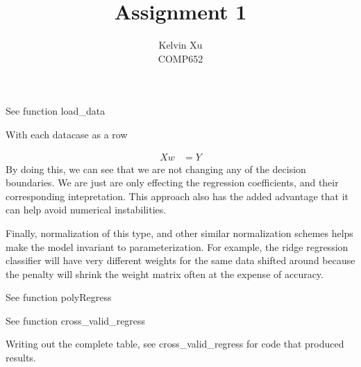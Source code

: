 \documentclass[12pt]{article}
\newenvironment{problem}[2][Problem]{\begin{trivlist}
\item[\hskip \labelsep {\bfseries #1}\hskip \labelsep {\bfseries #2.}]}{\end{trivlist}}
\begin{document}

\title{Assignment 1}%
\author{Kelvin Xu\\ %
COMP652} %

\maketitle
\begin{problem}{1. (a)}
See function load\_data
\end{problem}

\begin{problem}{1. (b)}
With each datacase as a row
\end{problem}
\begin{align*}
    Xw &= Y 
\end{align*}
By doing this, we can see that we are not changing any of the decision
boundaries. We are just are only effecting the regression coefficients, and
their corresponding intepretation. This approach also has the added advantage
that it can help avoid numerical instabilities.

Finally, normalization of this type, and other similar normalization schemes
helps make the model invariant to parameterization. For example, the ridge
regression classifier will have very different weights for the same data
shifted around because the penalty will shrink the weight matrix
often at the expense of accuracy. 

\begin{problem}{1. (c)}
See function polyRegress 
\end{problem}

\begin{problem}{1. (d)}
See function cross\_valid\_regress 
\end{problem}

\begin{problem}{1. (e)}
Writing out the complete table, see cross\_valid\_regress
for code that produced results.
\end{problem}
\end{document}

